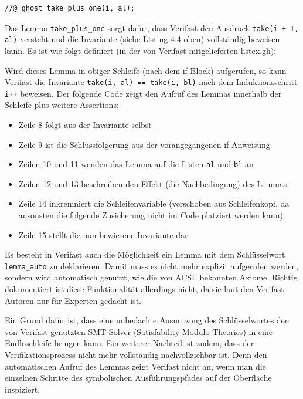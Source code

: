 \lstset{frame=none, numbers=none}                      
\begin{lstlisting}
//@ ghost take_plus_one(i, al);
\end{lstlisting}
\lstset{frame=single, numbers=left}    
Das Lemma \lstinline{take_plus_one} sorgt dafür, dass Verifast den Ausdruck \lstinline{take(i + 1, al)}
versteht und die Invariante (siehe Listing 4.4 oben) vollständig beweisen kann. Es ist wie folgt
definiert (in der von Verifast mitgelieferten listex.gh):
\begin{figure}[H]

\end{figure}
Wird dieses Lemma in obiger Schleife (nach dem if-Block) aufgerufen, so kann Verifast
die Invariante \lstinline{take(i, al) == take(i, bl)} nach dem Induktionsschritt \lstinline{i++}
beweisen. Der folgende Code zeigt den Aufruf des Lemmas innerhalb der Schleife plus weitere Assertions:
\begin{itemize}
\item Zeile 8 folgt aus der Invariante selbst
\item Zeile 9 ist die Schlussfolgerung aus der vorangegangenen if-Anweisung
\item Zeilen 10 und 11 wenden das Lemma auf die Listen \lstinline{al} und \lstinline{bl} an
\item Zeilen 12 und 13 beschreiben den Effekt (die Nachbedingung) des Lemmas
\item Zeile 14 inkremniert die Schleifenvariable (verschoben aus Schleifenkopf, da ansonsten die folgende Zusicherung nicht im Code platziert werden kann)
\item Zeile 15 stellt die nun bewiesene Invariante dar
\end{itemize}



Es besteht in Verifast auch die Möglichkeit ein Lemma mit dem Schlüsselwort \lstinline{lemma_auto} zu deklarieren.
Damit muss es nicht mehr explizit aufgerufen werden, sondern wird automatisch genutzt, wie die von 
ACSL bekannten Axiome. Richtig dokumentiert ist diese Funktionalität allerdings nicht, da sie laut den Verifast-Autoren
nur für Experten gedacht ist. 

Ein Grund dafür ist, dass eine unbedachte Ausnutzung des Schlüsselwortes
den von Verifast genutzten SMT-Solver (Satisfability Modulo Theories) in eine Endloschleife bringen kann. Ein
weiterer Nachteil ist zudem, dass der Verifikationsprozess nicht mehr vollständig nachvollziehbar ist.
Denn den automatischen Aufruf des Lemmas zeigt Verifast nicht an, wenn man die einzelnen
Schritte des symbolischen Ausführungspfades auf der Oberfläche inspiziert.

